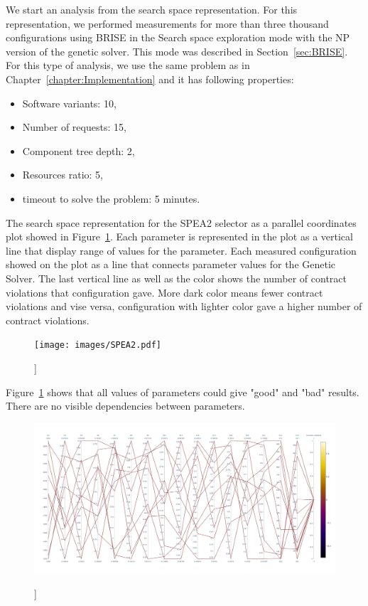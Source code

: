 We start an analysis from the search space representation. For this representation, we performed measurements for more than three thousand configurations using BRISE in the Search space exploration mode with the NP version of the genetic solver. This mode was described in Section~\ref{sec:BRISE}. For this type of analysis, we use the same problem as in Chapter~\ref{chapter:Implementation} and it has following properties:
\begin{itemize}
	\item Software variants: 10,
	\item Number of requests: 15,
	\item Component tree depth: 2,
	\item Resources ratio: 5,
	\item timeout to solve the problem: 5 minutes.
\end{itemize}

The search space representation for the SPEA2 selector as a parallel coordinates plot showed in Figure~\ref{fig:SearchSpaceViewFull}.
Each parameter is represented in the plot as a vertical line that display range of values for the parameter. Each measured configuration showed on the plot as a line that connects parameter values for the Genetic Solver. The last vertical line as well as the color shows the number of contract violations that configuration gave. More dark color means fewer contract violations and vise versa, configuration with lighter color gave a higher number of contract violations.

\begin{figure}
	\centering
	\texttt{[image: images/SPEA2.pdf]}
	\caption[]]{}
	\label{fig:SearchSpaceViewFull}
\end{figure}

Figure~\ref{fig:SearchSpaceViewFull} shows that all values of parameters could give "good" and "bad" results. There are no visible dependencies between parameters. 

\begin{figure}
	\centering
	\includegraphics[width=\textwidth]{images/SPEA2_Zero_validity.html.pdf}
	\caption[]]{}
	\label{fig:SearchSpaceValid}
\end{figure}

